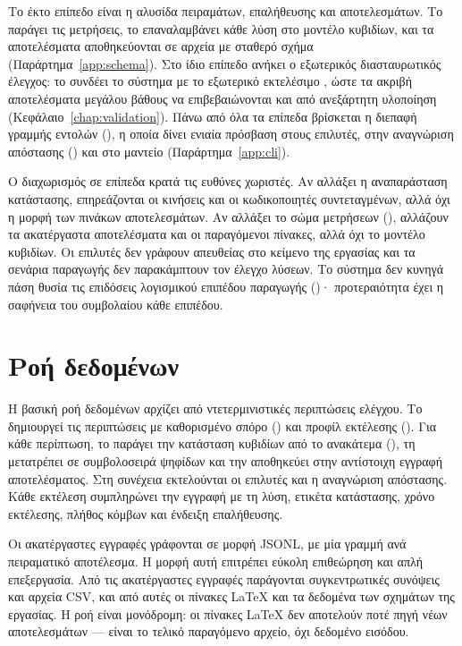 Το έκτο επίπεδο είναι η αλυσίδα πειραμάτων, επαλήθευσης και αποτελεσμάτων. Το  παράγει τις μετρήσεις, το  επαναλαμβάνει κάθε λύση στο μοντέλο κυβιδίων, και τα αποτελέσματα αποθηκεύονται σε αρχεία με σταθερό σχήμα (Παράρτημα~\ref{app:schema}). Στο ίδιο επίπεδο ανήκει ο εξωτερικός διασταυρωτικός έλεγχος: το  συνδέει το σύστημα με το εξωτερικό εκτελέσιμο , ώστε τα ακριβή αποτελέσματα μεγάλου βάθους να επιβεβαιώνονται και από ανεξάρτητη υλοποίηση (Κεφάλαιο~\ref{chap:validation}). Πάνω από όλα τα επίπεδα βρίσκεται η διεπαφή γραμμής εντολών (), η οποία δίνει ενιαία πρόσβαση στους επιλυτές, στην αναγνώριση απόστασης () και στο μαντείο (Παράρτημα~\ref{app:cli}).

Ο διαχωρισμός σε επίπεδα κρατά τις ευθύνες χωριστές. Αν αλλάξει η αναπαράσταση κατάστασης, επηρεάζονται οι κινήσεις και οι κωδικοποιητές συντεταγμένων, αλλά όχι η μορφή των πινάκων αποτελεσμάτων. Αν αλλάξει το σώμα μετρήσεων (), αλλάζουν τα ακατέργαστα αποτελέσματα και οι παραγόμενοι πίνακες, αλλά όχι το μοντέλο κυβιδίων. Οι επιλυτές δεν γράφουν απευθείας στο κείμενο της εργασίας και τα σενάρια παραγωγής δεν παρακάμπτουν τον έλεγχο λύσεων. Το σύστημα δεν κυνηγά πάση θυσία τις επιδόσεις λογισμικού επιπέδου παραγωγής ()· προτεραιότητα έχει η σαφήνεια του συμβολαίου κάθε επιπέδου.

\section{Ροή δεδομένων}
\label{sec:design-dataflow}
Η βασική ροή δεδομένων αρχίζει από ντετερμινιστικές περιπτώσεις ελέγχου. Το  δημιουργεί τις περιπτώσεις με καθορισμένο σπόρο () και προφίλ εκτέλεσης (). Για κάθε περίπτωση, το  παράγει την κατάσταση κυβιδίων από το ανακάτεμα (), τη μετατρέπει σε συμβολοσειρά ψηφίδων και την αποθηκεύει στην αντίστοιχη εγγραφή αποτελέσματος. Στη συνέχεια εκτελούνται οι επιλυτές και η αναγνώριση απόστασης. Κάθε εκτέλεση συμπληρώνει την εγγραφή με τη λύση, ετικέτα κατάστασης, χρόνο εκτέλεσης, πλήθος κόμβων και ένδειξη επαλήθευσης.

Οι ακατέργαστες εγγραφές γράφονται σε μορφή JSONL, με μία γραμμή ανά πειραματικό αποτέλεσμα. Η μορφή αυτή επιτρέπει εύκολη επιθεώρηση και απλή επεξεργασία. Από τις ακατέργαστες εγγραφές παράγονται συγκεντρωτικές συνόψεις και αρχεία CSV, και από αυτές οι πίνακες LaTeX και τα δεδομένα των σχημάτων της εργασίας. Η ροή είναι μονόδρομη: οι πίνακες LaTeX δεν αποτελούν ποτέ πηγή νέων αποτελεσμάτων — είναι το τελικό παραγόμενο αρχείο, όχι δεδομένο εισόδου.

